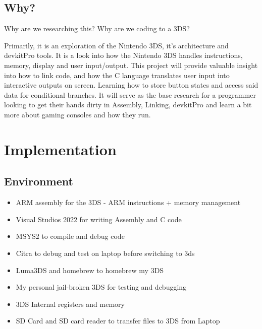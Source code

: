 \documentclass{article}
\begin{document}
\subsection{Why?}
Why are we researching this? Why are we coding to a 3DS?

\noindent Primarily, it is an exploration of the Nintendo 3DS, it's architecture and devkitPro tools. It is a look into how the Nintendo 3DS handles instructions, memory, display and user input/output. This project will provide valuable insight into how to link code, and how the C language translates user input into interactive outputs on screen. Learning how to store button states and access said data for conditional branches. It will serve as the base research for a programmer looking to get their hands dirty in Assembly, Linking, devkitPro and learn a bit more about gaming consoles and how they run.


\section{Implementation}
\subsection{Environment}
\begin{itemize}
\item ARM assembly for the 3DS - ARM instructions + memory management
\item Visual Studios 2022 for writing Assembly and C code
\item MSYS2 to compile and debug code
\item Citra to debug and test on laptop before switching to 3ds
\item Luma3DS and homebrew to homebrew my 3DS
\item My personal jail-broken 3DS for testing and debugging
\item 3DS Internal registers and memory 
\item SD Card and SD card reader to transfer files to 3DS from Laptop
\end{itemize}
\end{document}
